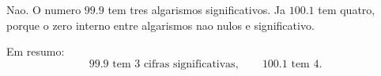 Nao. O numero $99.9$ tem tres algarismos significativos. Ja $100.1$ tem quatro, porque o zero interno entre algarismos nao nulos e significativo.

Em resumo:
\[
99.9 \text{ tem } 3 \text{ cifras significativas},
\qquad
100.1 \text{ tem } 4.
\]

